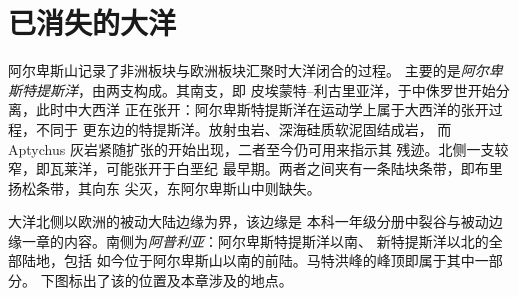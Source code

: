 \section{已消失的大洋}\label{sec:b2:alpine-orogen:tethys}

阿尔卑斯山记录了非洲板块与欧洲板块汇聚时大洋闭合的过程。
主要的是\emph{阿尔卑斯特提斯洋}，由两支构成。其南支，即
皮埃蒙特–利古里亚洋，于中侏罗世开始分离，此时中大西洋
正在张开：阿尔卑斯特提斯洋在运动学上属于大西洋的张开过程，不同于
更东边的特提斯洋。放射虫岩、深海硅质软泥固结成岩，
而 Aptychus 灰岩紧随扩张的开始出现，二者至今仍可用来指示其
残迹。北侧一支较窄，即瓦莱洋，可能张开于白垩纪
最早期。两者之间夹有一条陆块条带，即布里扬松条带，其向东
尖灭，东阿尔卑斯山中则缺失。

大洋北侧以欧洲的被动大陆边缘为界，该边缘是
本科一年级分册中裂谷与被动边缘一章的内容。南侧为\emph{阿普利亚}：阿尔卑斯特提斯洋以南、
新特提斯洋以北的全部陆地，包括
如今位于阿尔卑斯山以南的前陆。马特洪峰的峰顶即属于其中一部分。
下图标出了该的位置及本章涉及的地点。

